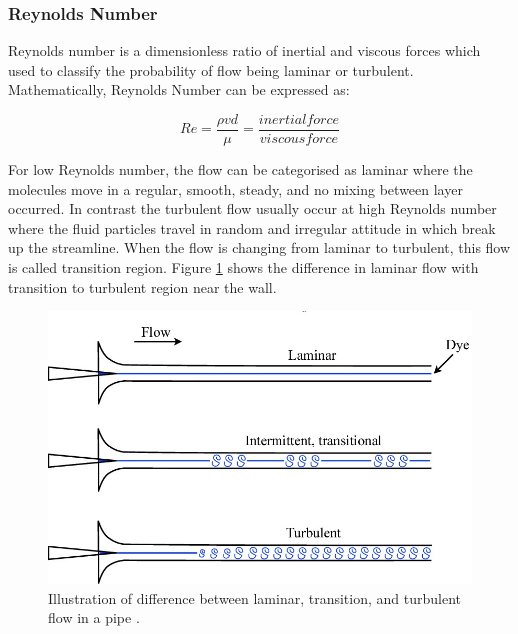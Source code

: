 \subsubsection{Reynolds Number}
Reynolds number is a dimensionless ratio of inertial and viscous forces which used to classify the probability of flow being laminar or turbulent\cite{Rehm2008SituationalMPD}. Mathematically, Reynolds Number can be expressed as:

\begin{equation}
Re = \frac{\rho v d}{\mu} = \frac{inertial force}{viscous force}
\end{equation}

\noindent For low Reynolds number, the flow can be categorised as laminar where the molecules move in a regular, smooth, steady, and no mixing between layer occurred\cite{Obidi2014TheoryVehicles}. In contrast the turbulent flow usually occur at high Reynolds number where the fluid particles travel in random and irregular attitude in which break up the streamline. When the flow is changing from laminar to turbulent, this flow is called transition region. Figure \ref{fig:2} shows the difference in laminar flow with transition to turbulent region near the wall. 

\begin{figure}[!h]
    \centering
    \includegraphics[scale=0.3]{Figures/laminar_turbulent_difference.jpg}
    \caption{Illustration of difference between laminar, transition, and turbulent flow in a pipe \cite{D.BARKLE2016TheoreticalPipe}.}
    \label{fig:2}
\end{figure}

